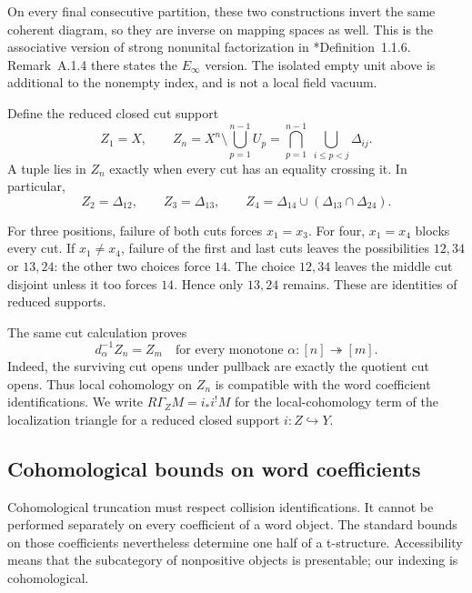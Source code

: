On every final consecutive partition, these two constructions invert the
same coherent diagram, so they are inverse on mapping spaces as well.
This is the associative version of strong nonunital factorization in
\cite{interfaces-Lat}*{Definition~1.1.6}. Remark~A.1.4 there states the
$E_\infty$ version. The isolated empty unit above is additional to the
nonempty index, and is not a local field vacuum.

Define the reduced closed cut support
\begin{equation}\label{ogd:eq:Z-support}
 Z_1=X,\qquad
 Z_n=X^n\setminus\bigcup_{p=1}^{n-1}U_p
     =\bigcap_{p=1}^{n-1}\ \bigcup_{i\leq p<j}\Delta_{ij}.
\end{equation}
A tuple lies in $Z_n$ exactly when every cut has an equality crossing it.
In particular,
\begin{equation}\label{ogd:eq:Z-small}
 Z_2=\Delta_{12},\qquad Z_3=\Delta_{13},\qquad
 Z_4=\Delta_{14}\cup(\Delta_{13}\cap\Delta_{24}).
\end{equation}

For three positions, failure of both cuts forces $x_1=x_3$.
For four, $x_1=x_4$ blocks every cut.
If $x_1\ne x_4$, failure of the first and last cuts leaves the possibilities
$12,34$ or $13,24$: the other two choices force $14$.
The choice $12,34$ leaves the middle cut disjoint unless it too forces
$14$. Hence only $13,24$ remains. These are identities of reduced supports.

The same cut calculation proves
\begin{equation}\label{ogd:eq:Z-pullback}
 d_\alpha^{-1}Z_n=Z_m
 \quad\text{for every monotone }\alpha:[n]\twoheadrightarrow[m].
\end{equation}
Indeed, the surviving cut opens under pullback are exactly the quotient
cut opens. Thus local cohomology on $Z_n$ is compatible with the word
coefficient identifications. We write\label{ogd:def:supported-local-cohomology} $R\Gamma_Z M=i_*i^!M$ for the
local-cohomology term of the localization triangle for a reduced closed
support $i:Z\hookrightarrow Y$.

\subsection{Cohomological bounds on word coefficients}

Cohomological truncation must respect collision identifications.
It cannot be performed separately on every coefficient of a word
object. The standard bounds on those coefficients nevertheless
determine one half of a t-structure.
Accessibility means that the subcategory of nonpositive objects
is presentable; our indexing is cohomological.

